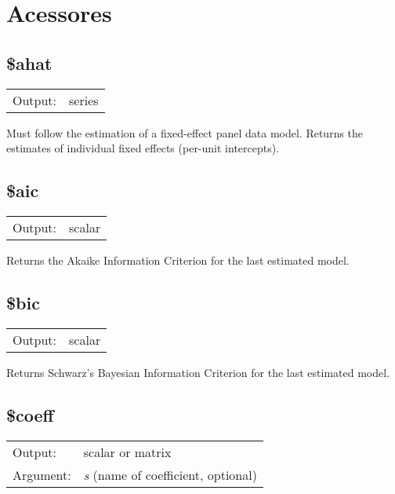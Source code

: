 \section{Acessores}
\label{sec:accessors}

\subsection{\$ahat}
\hypertarget{func-dolahat}{}

\begin{tabular}{ll}
Output:     & series\\
\end{tabular}

	  Must follow the estimation of a fixed-effect panel data model.
	  Returns the estimates of individual fixed effects (per-unit
	  intercepts).

\subsection{\$aic}
\hypertarget{func-dolaic}{}

\begin{tabular}{ll}
Output:     & scalar\\
\end{tabular}

	  Returns the Akaike Information Criterion for the last estimated
	  model. 

\subsection{\$bic}
\hypertarget{func-dolbic}{}

\begin{tabular}{ll}
Output:     & scalar\\
\end{tabular}

	  Returns Schwarz's Bayesian Information Criterion for the last
	  estimated model.

\subsection{\$coeff}
\hypertarget{func-dolcoeff}{}

\begin{tabular}{ll}
Output:     & scalar or matrix\\
Argument:   & \textsl{s} (name of coefficient, optional)\\
\end{tabular}

